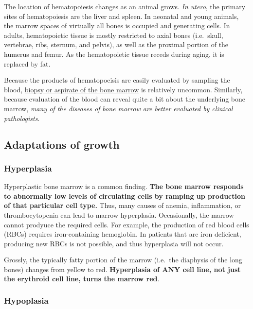 \documentclass[openany]{article}
\begin{document}
The location of hematopoiesis changes as an animal grows. \emph{In
utero}, the primary sites of hematopoiesis are the liver and spleen. In
neonatal and young animals, the marrow spaces of virtually all bones is
occupied and generating cells. In adults, hematopoietic tissue is mostly
restricted to axial bones (i.e.~skull, vertebrae, ribs, sternum, and
pelvis), as well as the proximal portion of the humerus and femur. As
the hematopoietic tissue receds during aging, it is replaced by fat.

Because the products of hematopoeisis are easily evaluated by sampling
the blood, \protect\hyperlink{biopsy-of-the-bone-marrow}{biopsy or
aspirate of the bone marrow} is relatively uncommon. Similarly, because
evaluation of the blood can reveal quite a bit about the underlying bone
marrow, \emph{many of the diseases of bone marrow are better evaluated
by clinical pathologists}.

\subsection{Adaptations of growth}\label{adaptations-of-growth}

\hypertarget{hyperplasia}{\subsubsection{Hyperplasia}\label{hyperplasia}}

Hyperplastic bone marrow is a common finding. \textbf{The bone marrow
responds to abnormally low levels of circulating cells by ramping up
production of that particular cell type.} Thus, many causes of anemia,
inflammation, or thrombocytopenia can lead to marrow hyperplasia.
Occasionally, the marrow cannot prodyuce the required cells. For
example, the production of red blood cells (RBCs) requires
iron-containing hemoglobin. In patients that are iron deficient,
producing new RBCs is not possible, and thus hyperplasia will not occur.

Grossly, the typically fatty portion of the marrow (i.e.~the diaphysis
of the long bones) changes from yellow to red. \textbf{Hyperplasia of
ANY cell line, not just the erythroid cell line, turns the marrow red}.

\subsubsection{Hypoplasia}\label{hypoplasia}
\end{document}
